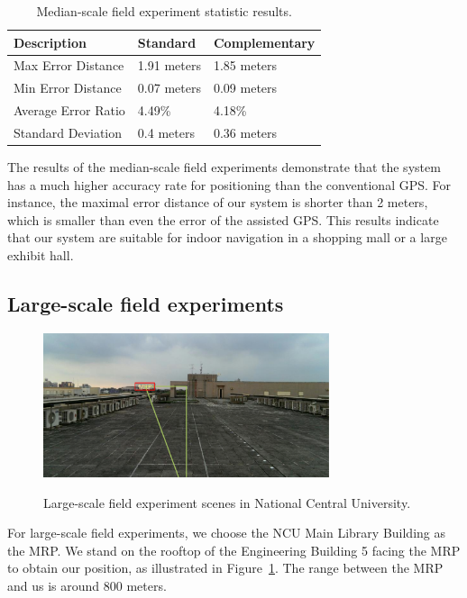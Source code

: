 \begin{table}
\begin{center}
\vspace{-10pt}
    \begin{tabular}{ | l | l | l |}
    \hline
    Description & Standard & Complementary \\ \hline\hline
    Max Error Distance & 1.91 meters & 1.85 meters \\ \hline
    Min Error Distance & 0.07 meters & 0.09 meters \\ \hline
    Average Error Ratio & 4.49\% & 4.18\% \\ \hline
    Standard Deviation & 0.4 meters & 0.36 meters \\ \hline
    \end{tabular}
\end{center}
\vspace{-15pt}
\caption{Median-scale field experiment statistic results.}\label{tb-median-scale-analysis}
\vspace{-15pt}
\end{table} 
The results of the median-scale field experiments demonstrate that the system has a much higher accuracy rate for positioning than the conventional GPS. For instance, the maximal error distance of our system is shorter than 2 meters, which is smaller than even the error of the assisted GPS. This results indicate that our system are suitable for indoor navigation in a shopping mall or a large exhibit hall.

\subsection{Large-scale field experiments}
\begin{figure}
  \vspace{-20pt}
  \centering
  \includegraphics[width=3.3in]{fig/large-scale-scenes.eps}\\
  \vspace{-10pt}
  \caption{Large-scale field experiment scenes in National Central University.}\label{fg-large-scale-scenes}
  \vspace{-90pt}
\end{figure}
For large-scale field experiments, we choose the NCU Main Library Building as the MRP. We stand on the rooftop of the Engineering Building 5 facing the MRP to obtain our position, as illustrated in Figure~\ref{fg-large-scale-scenes}. The range between the MRP and us is around 800 meters.

